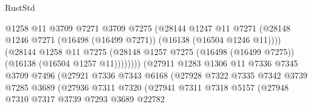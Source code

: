 \begin{lexlean}{RustStd}
\begin{coremodule}
                                      @1258
                                      @11
                                      @3709
                                      @7271
                                      @3709
                                      @7275
                                      (@28144
                                        @1247
                                        @11
                                        @7271
                                        (@28148
                                          @1246
                                          @7271
                                          (@16498 (@16499 @7271))
                                          (@16138 (@16504 @1246 @11))))
                                      (@28144
                                        @1258
                                        @11
                                        @7275
                                        (@28148
                                          @1257
                                          @7275
                                          (@16498 (@16499 @7275))
                                          (@16138 (@16504 @1257 @11))))))))
                              (@27911
                                @1283
                                @1306
                                @11
                                @7336
                                @7345
                                @3709
                                @7496
                                (@27921
                                  @7336
                                  @7343
                                  @6168
                                  (@27928
                                    @7322
                                    @7335
                                    @7342
                                    @3739
                                    @7285
                                    @3689
                                    (@27936
                                      @7311
                                      @7320
                                      (@27941
                                        @7311
                                        @7318
                                        @5157
                                        (@27948
                                          @7310
                                          @7317
                                          @3739
                                          @7293
                                          @3689
                                          @22782

\end{coremodule}
\end{lexlean}
